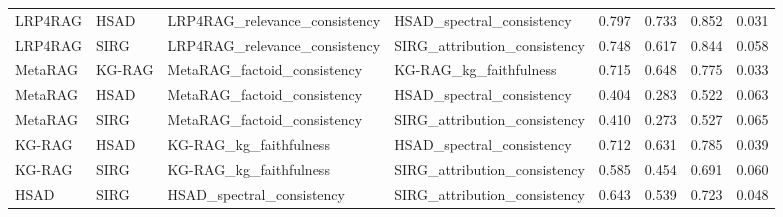 \begin{table}
\begin{tabular}{llllrrrr}
LRP4RAG & HSAD & LRP4RAG_relevance_consistency & HSAD_spectral_consistency & 0.797 & 0.733 & 0.852 & 0.031 \\
LRP4RAG & SIRG & LRP4RAG_relevance_consistency & SIRG_attribution_consistency & 0.748 & 0.617 & 0.844 & 0.058 \\
MetaRAG & KG-RAG & MetaRAG_factoid_consistency & KG-RAG_kg_faithfulness & 0.715 & 0.648 & 0.775 & 0.033 \\
MetaRAG & HSAD & MetaRAG_factoid_consistency & HSAD_spectral_consistency & 0.404 & 0.283 & 0.522 & 0.063 \\
MetaRAG & SIRG & MetaRAG_factoid_consistency & SIRG_attribution_consistency & 0.410 & 0.273 & 0.527 & 0.065 \\
KG-RAG & HSAD & KG-RAG_kg_faithfulness & HSAD_spectral_consistency & 0.712 & 0.631 & 0.785 & 0.039 \\
KG-RAG & SIRG & KG-RAG_kg_faithfulness & SIRG_attribution_consistency & 0.585 & 0.454 & 0.691 & 0.060 \\
HSAD & SIRG & HSAD_spectral_consistency & SIRG_attribution_consistency & 0.643 & 0.539 & 0.723 & 0.048 \\
\bottomrule
\end{tabular}
\end{table}


